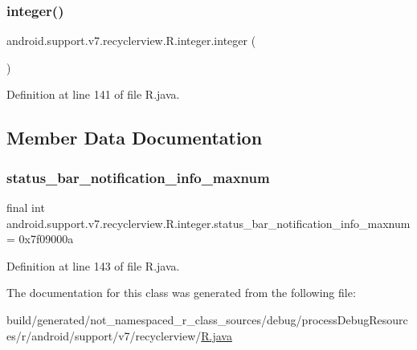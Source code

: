 \subsubsection{\texorpdfstring{integer()}{integer()}}
{\footnotesize\ttfamily android.\+support.\+v7.\+recyclerview.\+R.\+integer.\+integer (\begin{DoxyParamCaption}{ }\end{DoxyParamCaption})\hspace{0.3cm}{\ttfamily [private]}}



Definition at line 141 of file R.\+java.


\begin{DoxyCode}{0}

\end{DoxyCode}


\subsection{Member Data Documentation}
\mbox{\label{classandroid_1_1support_1_1v7_1_1recyclerview_1_1_r_1_1integer_ad9015376b52984f0f7509667c0934f11}} 
\subsubsection{\texorpdfstring{status\_bar\_notification\_info\_maxnum}{status\_bar\_notification\_info\_maxnum}}
{\footnotesize\ttfamily final int android.\+support.\+v7.\+recyclerview.\+R.\+integer.\+status\+\_\+bar\+\_\+notification\+\_\+info\+\_\+maxnum = 0x7f09000a\hspace{0.3cm}{\ttfamily [static]}}



Definition at line 143 of file R.\+java.



The documentation for this class was generated from the following file\+:\begin{DoxyCompactItemize}
\item 
build/generated/not\+\_\+namespaced\+\_\+r\+\_\+class\+\_\+sources/debug/process\+Debug\+Resources/r/android/support/v7/recyclerview/\mbox{\hyperlink{android_2support_2v7_2recyclerview_2_r_8java}{R.\+java}}\end{DoxyCompactItemize}
